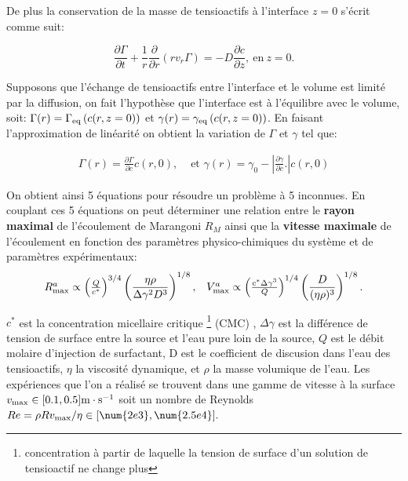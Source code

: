 \documentclass[french, 10pt]{article}
\begin{document}
De plus la conservation de la masse de tensioactifs à l'interface $z=0$ s'écrit comme suit: 

\begin{equation}
  \frac{\partial \Gamma}{\partial t}+\frac{1}{r}\frac{\partial }{\partial r}\left(r v_r \Gamma\right) = -D\frac{\partial c}{\partial z},~\text{en}~z=0.\label{eq:conservationdelamassedesurfactant}
\end{equation}



Supposons que l'échange de tensioactifs entre l'interface et le volume est limité par la diffusion, on fait l'hypothèse que l'interface est à l'équilibre avec le volume, soit: $\Gamma(r)=\Gamma_{\rm eq}\left(c(r,z=0)\right)$ et $\gamma(r)=\gamma_{\rm eq}\left(c(r,z=0)\right)$. En faisant l'approximation de linéarité on obtient la variation de $\Gamma$ et $\gamma$ tel que:

\begin{equation}
    \begin{array}{cc}
      \Gamma(r)=\frac{\partial \Gamma}{\partial c}c(r,0), & \text{ et } \gamma(r)=\gamma_0-\left|\frac{\partial \gamma}{\partial c}.\right|c(r,0)\label{eq:gradientconcentration}
   \end{array}
\end{equation}

On obtient ainsi 5 équations pour résoudre un problème à 5 inconnues. En couplant ces 5 équations on peut déterminer une relation entre le \textbf{rayon maximal} de l'écoulement de Marangoni $R_M$ ainsi que la \textbf{vitesse maximale} de l'écoulement en fonction des paramètres physico-chimiques du système et de paramètres expérimentaux:
% 
\begin{equation}
  \begin{array}{cc}

  R_{\rm max}^{a} \propto \left(\frac{Q}{c^{*}}\right)^{3/4}\left(\dfrac{\eta\rho}{\Delta\gamma^2 D^3}\right)^{1/8}, & V_{\rm max}^{a}\propto\left(\frac{c^{*}\Delta\gamma^3}{Q}\right)^{1/4}\left(\dfrac{D}{(\eta\rho)^3}\right)^{1/8}.\label{eq:rmarangoni}
      
\end{array}
\end{equation}


$c^*$ est la concentration micellaire critique \footnote{concentration à partir de laquelle la tension de surface d'un solution de tensioactif ne change plus}  (CMC) , $\Delta\gamma$ est la différence de tension de surface entre la source et l'eau pure loin de la source, $Q$ est le débit molaire d'injection de surfactant, D est le coefficient de discusion dans l'eau des tensioactifs, $\eta$ la viscosité dynamique, et $\rho$ la masse volumique de l'eau. Les expériences que l'on a réalisé se trouvent dans une gamme de vitesse à la surface $v_{\rm max} \in [0.1, 0.5] \rm m\cdot s^{-1}$ soit un nombre de Reynolds $Re=\rho R v_{\rm max}/\eta \in [\num{2e3},\num{2.5e4}].$\medskip
\end{document}

